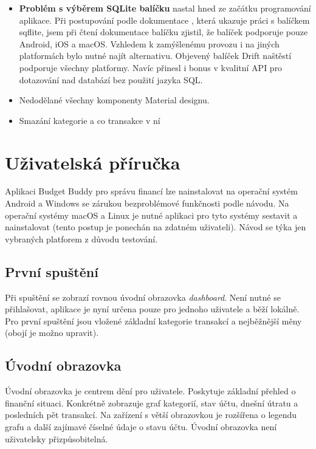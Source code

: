\documentclass[
  biblatex,
  figures=true,
  tables=false,
  glossaries,
  index
]{kidiplom}
\begin{document}
\begin{itemize}
  \item \textbf{Problém s výběrem SQLite balíčku} nastal hned ze začátku programování aplikace. Při postupování podle dokumentace \cite{flutter-docs}, která ukazuje práci s balíčkem sqflite, jsem při čtení dokumentace balíčku zjistil, že balíček podporuje pouze Android, iOS a macOS. Vzhledem k zamýšlenému provozu i na jiných platformách bylo nutné najít alternativu. Objevený balíček Drift naštěstí podporuje všechny platformy. Navíc přinesl i bonus v kvalitní API pro dotazování nad databází bez použití jazyka SQL.
  \item Nedodělané všechny komponenty Material designu.
  \item Smazání kategorie a co transakce v ní
\end{itemize}

\section{Uživatelská příručka}
Aplikaci Budget Buddy pro správu financí lze nainstalovat na operační systém Android a Windows se zárukou bezproblémové funkčnosti podle návodu. Na operační systémy macOS a Linux je nutné aplikaci pro tyto systémy sestavit a nainstalovat (tento postup je ponechán na zdatném uživateli). Návod se týka jen vybraných platforem z důvodu testování. 

\subsection{První spuštění}
Při spuštění se zobrazí rovnou úvodní obrazovka \textit{dashboard}. Není nutné se přihlašovat, aplikace je nyní určena pouze pro jednoho uživatele a běží lokálně. Pro první spuštění jsou vložené základní kategorie transakcí a nejběžnější měny (obojí je možno upravit). 

\subsection{Úvodní obrazovka}
Úvodní obrazovka je centrem dění pro uživatele. Poskytuje základní přehled o finanční situaci. Konkrétně zobrazuje graf kategorií, stav účtu, dnešní útratu a posledních pět transakcí. Na zařízení s větší obrazovkou je rozšířena o legendu grafu a další zajímavé číselné údaje o stavu účtu. Úvodní obrazovka není uživatelsky přizpůsobitelná.
\end{document}
